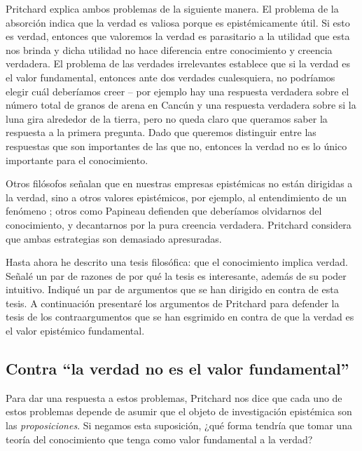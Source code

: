 \documentclass{article}
\begin{document}
Pritchard explica ambos problemas de la siguiente manera. El problema de la absorción indica que la verdad es valiosa porque es epistémicamente útil. Si esto es verdad, entonces que valoremos la verdad es parasitario a la utilidad que esta nos brinda y dicha utilidad no hace diferencia entre conocimiento y creencia verdadera. El problema de las verdades irrelevantes establece que si la verdad es el valor fundamental, entonces ante dos verdades cualesquiera, no podríamos elegir cuál deberíamos creer -- por ejemplo hay una respuesta verdadera sobre el número total de granos de arena en Cancún y una respuesta verdadera sobre si la luna gira alrededor de la tierra, pero no queda claro que queramos saber la respuesta a la primera pregunta. Dado que queremos distinguir entre las respuestas que son importantes de las que no, entonces la verdad no es lo único importante para el conocimiento.

Otros filósofos señalan que en nuestras empresas epistémicas no están dirigidas a la verdad, sino a otros valores epistémicos, por ejemplo, al entendimiento de un fenómeno \cite{Elgin2004}; otros como Papineau \cite{Papineau2021} defienden que deberíamos olvidarnos del conocimiento, y decantarnos por la pura creencia verdadera. Pritchard considera que ambas estrategias son demasiado apresuradas.

Hasta ahora he descrito una tesis filosófica: que el conocimiento implica verdad. Señalé un par de razones de por qué la tesis es interesante, además de su poder intuitivo. Indiqué un par de argumentos que se han dirigido en contra de esta tesis. A continuación presentaré los argumentos de Pritchard para defender la tesis de los contraargumentos que se han esgrimido en contra de que la verdad es el valor epistémico fundamental.

\subsection{Contra ``la verdad no es el valor fundamental''}

\noindent Para dar una respuesta a estos problemas, Pritchard nos dice que cada uno de estos problemas depende de asumir que el objeto de investigación epistémica son las \textit{proposiciones}. Si negamos esta suposición, ¿qué forma tendría que tomar una teoría del conocimiento que tenga como valor fundamental a la verdad?
\end{document}
